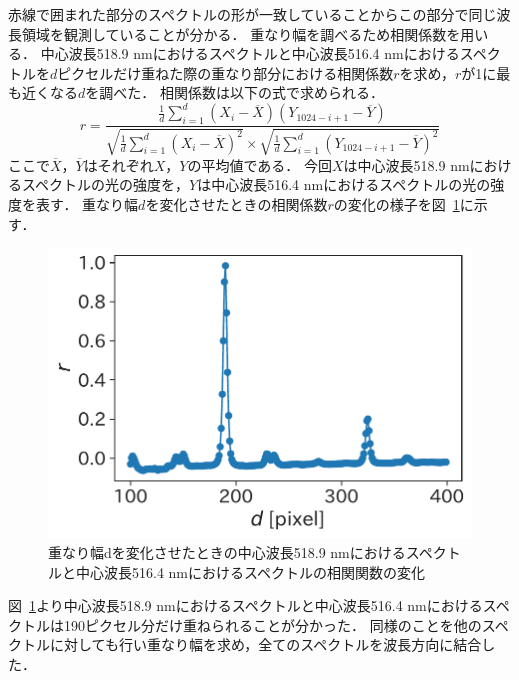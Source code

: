 赤線で囲まれた部分のスペクトルの形が一致していることからこの部分で同じ波長領域を観測していることが分かる．
重なり幅を調べるため相関係数を用いる．
中心波長518.9 nmにおけるスペクトルと中心波長516.4 nmにおけるスペクトルを$d$ピクセルだけ重ねた際の重なり部分における相関係数$r$を求め，$r$が1に最も近くなる$d$を調べた．
相関係数は以下の式で求められる．
\begin{equation}
     r = \frac{\frac{1}{d}\sum_{i=1}^{d} {(X_i-\overline{X})(Y_{1024-i+1}-\overline{Y})}}{{\sqrt{\frac{1}{d}\sum_{i=1}^{d} {(X_i-\overline{X})^2}}\times\sqrt{{\frac{1}{d}\sum_{i=1}^{d} {(Y_{1024-i+1}-\overline{Y})^2}}}}}
\end{equation}
ここで$\overline{X}$，$\overline{Y}$はそれぞれ$X$，$Y$の平均値である．
今回$X$は中心波長518.9 nmにおけるスペクトルの光の強度を，$Y$は中心波長516.4 nmにおけるスペクトルの光の強度を表す．
重なり幅$d$を変化させたときの相関係数$r$の変化の様子を図\ \ref{fig:correlation_coefficients}に示す．
\begin{figure}[htbp]
    \centering
    \includegraphics[scale=0.7]{figure/correlation_coefficients.pdf}
    \caption{重なり幅dを変化させたときの中心波長518.9 nmにおけるスペクトルと中心波長516.4 nmにおけるスペクトルの相関関数の変化}
    \label{fig:correlation_coefficients}
\end{figure}
図\ \ref{fig:correlation_coefficients}より中心波長518.9 nmにおけるスペクトルと中心波長516.4 nmにおけるスペクトルは190ピクセル分だけ重ねられることが分かった．
同様のことを他のスペクトルに対しても行い重なり幅を求め，全てのスペクトルを波長方向に結合した．

